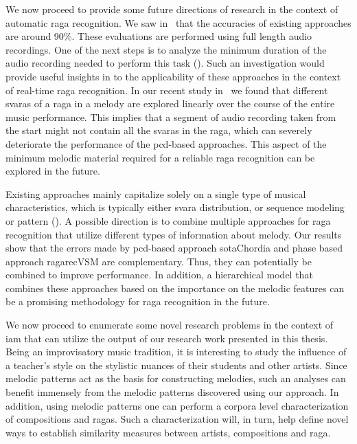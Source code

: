 We now proceed to provide some future directions of research in the context of automatic \gls{raga} recognition. We saw in~ that the accuracies of existing approaches are around 90\%. These evaluations are performed using full length audio recordings. One of the next steps is to analyze the minimum duration of the audio recording needed to perform this task (\cite{balkwill1999cross}). Such an investigation would provide useful insights in to the applicability of these approaches in the context of real-time \gls{raga} recognition. In our recent study in~\cite{kaustuv_ismir_2016} we found that different \glspl{svara} of a \gls{raga} in a melody are explored linearly over the course of the entire music performance. This implies that a segment of audio recording taken from the start might not contain all the \glspl{svara} in the \gls{raga}, which can severely deteriorate the performance of the \gls{pcd}-based approaches. This aspect of the minimum melodic material required for a reliable \gls{raga} recognition can be explored in the future. 

Existing approaches mainly capitalize solely on a single type of musical characteristics, which is typically either svara distribution, or sequence modeling or pattern (). A possible direction is to combine multiple approaches for \gls{raga} recognition that utilize different types of information about melody. Our results show that the errors made by \gls{pcd}-based approach \acrshort{sotaChordia} and phase based approach \acrshort{ragarecVSM} are complementary. Thus, they can potentially be combined to improve performance. In addition, a hierarchical model that combines these approaches based on the importance on the melodic features can be a promising methodology for \gls{raga} recognition in the future.

We now proceed to enumerate some novel research problems in the context of \gls{iam} that can utilize the output of our research work presented in this thesis. Being an improvisatory music tradition, it is interesting to study the influence of a teacher’s style on the stylistic nuances of their students and other artists. Since melodic patterns act as the basis for constructing melodies, such an analyses can benefit immensely from the melodic patterns discovered using our approach. In addition, using melodic patterns one can perform a corpora level characterization of compositions and \glspl{raga}. Such a characterization will, in turn, help define novel ways to establish similarity measures between artists, compositions and \gls{raga}.

